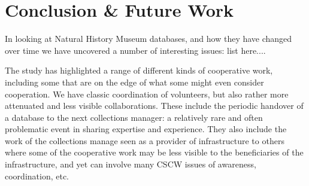 \section{Conclusion & Future Work}
In looking at Natural History Museum databases, and how they have changed over time we have uncovered a number of interesting issues:
list here....

The study has highlighted a range of different kinds of cooperative work, including some that are on the edge of what some might even consider cooperation. We have classic coordination of volunteers, but also rather more attenuated and less visible collaborations. These include the periodic handover of a database to the next collections manager: a relatively rare and often problematic event in sharing expertise and experience. They also include the work of the collections manage seen as a provider of infrastructure to others where some of the cooperative work may be less visible to the beneficiaries of the infrastructure, and yet can involve many CSCW issues of awareness, coordination, etc.